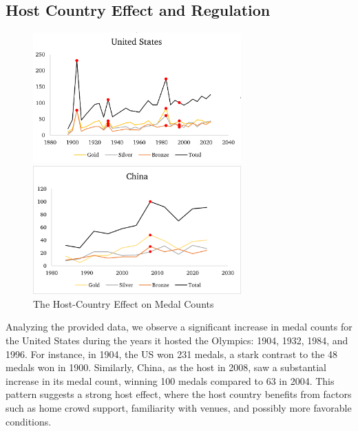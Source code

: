 \documentclass{mcmthesis}
\begin{document}
\subsection{Host Country Effect and Regulation}
\begin{figure}[htbp]
    \centering
    \begin{minipage}[t]{0.45\linewidth}
        \centering
        \includegraphics[width=8cm]{pics/USA.png}
    \end{minipage}%
    \hfill
    \begin{minipage}[t]{0.45\linewidth}
        \centering
        \includegraphics[width=8cm]{pics/CHN.png}
    \end{minipage}
    \caption{The Host-Country Effect on Medal Counts}
    \label{fig:host_country_effect}
\end{figure}


Analyzing the provided data, we observe a significant increase in medal counts for the United States during the years it hosted the Olympics: 1904, 1932, 1984, and 1996. For instance, in 1904, the US won 231 medals, a stark contrast to the 48 medals won in 1900. Similarly, China, as the host in 2008, saw a substantial increase in its medal count, winning 100 medals compared to 63 in 2004. This pattern suggests a strong host effect, where the host country benefits from factors such as home crowd support, familiarity with venues, and possibly more favorable conditions.
\end{document}
